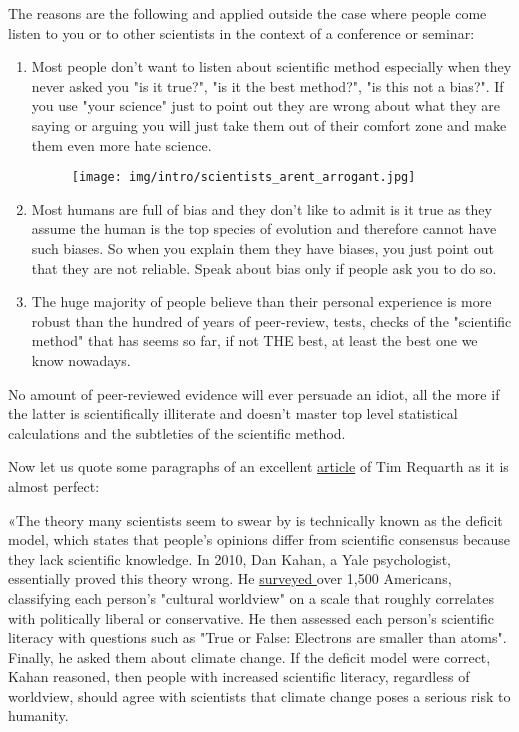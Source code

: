 	The reasons are the following and applied outside the case where people come listen to you or to other scientists in the context of a conference or seminar:
	\begin{enumerate}
		\item Most people don't want to listen about scientific method especially when they never asked you "is it true?", "is it the best method?", "is this not a bias?". If you use "your science" just to point out they are wrong about what they are saying or arguing you will just take them out of their comfort zone and make them even more hate science.
		
		\begin{figure}[H]
			\centering
			\texttt{[image: img/intro/scientists\_arent\_arrogant.jpg]}	
		\end{figure}
		
		\item Most humans are full of bias and they don't like to admit is it true as they assume the human is the top species of evolution and therefore cannot have such biases. So when you explain them they have biases, you just point out that they are not reliable. Speak about bias only if people ask you to do so.
		
		\item The huge majority of people believe than their personal experience is more robust than the hundred of years of peer-review, tests, checks of the "scientific method" that has seems so far, if not THE best, at least the best one we know nowadays.
	\end{enumerate}
	\begin{fquote}No amount of peer-reviewed evidence will ever persuade an idiot, all the more if the latter is scientifically illiterate and doesn't master top level statistical calculations and the subtleties of the scientific method.
 	\end{fquote}
 	
	Now let us quote some paragraphs of an excellent \href{http://www.slate.com/articles/health_and_science/science/2017/04/explaining_science_won_t_fix_information_illiteracy.html}{{\color{blue} article}} of Tim Requarth as it is almost perfect:
	

	«The theory many scientists seem to swear by is technically known as the deficit model, which states that people's opinions differ from scientific consensus because they lack scientific knowledge. In 2010, Dan Kahan, a Yale psychologist, essentially proved this theory wrong. He \href{http://www.nature.com/nclimate/journal/v2/n10/full/nclimate1547.html}{{\color{blue} surveyed }} over 1,500 Americans, classifying each person's "cultural worldview" on a scale that roughly correlates with politically liberal or conservative. He then assessed each person's scientific literacy with questions such as "True or False: Electrons are smaller than atoms". Finally, he asked them about climate change. If the deficit model were correct, Kahan reasoned, then people with increased scientific literacy, regardless of worldview, should agree with scientists that climate change poses a serious risk to humanity.
  
